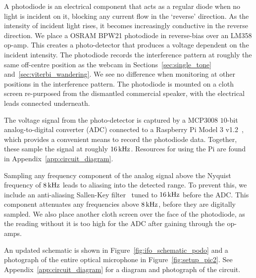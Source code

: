 \documentclass[paper-main.tex]{subfiles}
\begin{document}
A photodiode is an electrical component that acts as a regular diode when no light is incident on it, blocking any current flow in the `reverse' direction.
As the intensity of incident light rises, it becomes increasingly conductive in the reverse direction. 
We place a OSRAM BPW21 photodiode in reverse-bias over an LM358 op-amp. 
This creates a photo-detector that produces a voltage dependent on the incident intensity. 
The photodiode records the interference pattern at roughly the same off-centre position as the webcam in Sections~\ref{sec:single_tone} and~\ref{sec:viterbi_wandering}.
We see no difference when monitoring at other positions in the interference pattern.
The photodiode is mounted on a cloth screen re-purposed from the dismantled commercial speaker, with the electrical leads connected underneath. 


The voltage signal from the photo-detector is captured by a MCP3008 $10$-bit analog-to-digital converter (ADC) connected to a Raspberry Pi Model 3 v1.2~\cite{RaspberryPi:online}, which provides a convenient means to record the photodiode data.
Together, these sample the signal at roughly $16\,{\rm kHz}$. Resources for using the Pi are found in Appendix~\ref{app:circuit_diagram}.

Sampling any frequency component of the analog signal above the Nyquist frequency of $8\,{\rm kHz}$ leads to aliasing into the detected range. 
To prevent this, we include an anti-aliasing Sallen-Key filter~\cite{sallen_key_filter} tuned to $16\,{\rm kHz}$ before the ADC. 
This component attenuates any frequencies above $8\,{\rm kHz}$, before they are digitally sampled.
We also place another cloth screen over the face of the photodiode, as the reading without it is too high for the ADC after gaining through the op-amps. 

An updated schematic is shown in Figure~\ref{fig:ifo_schematic_podo} and a photograph of the entire optical microphone in Figure~\ref{fig:setup_pic2}.
See Appendix~\ref{app:circuit_diagram} for a diagram and photograph of the circuit. 
\end{document}
